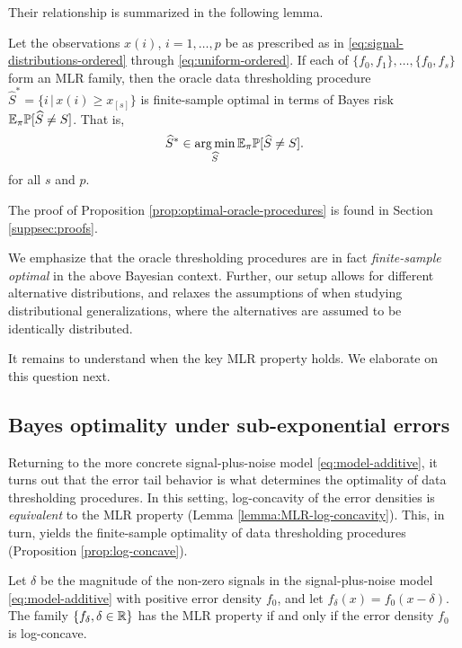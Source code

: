 Their relationship is summarized in the following lemma.

\begin{proposition} \label{prop:optimal-oracle-procedures}
Let the observations $x(i)$, $i=1,\ldots,p$ be as prescribed as in \eqref{eq:signal-distributions-ordered} through \eqref{eq:uniform-ordered}.
If each of $\{f_0, f_{1}\},\ldots,\{f_0,f_{s}\}$ form an MLR family, then the oracle data thresholding procedure $\widehat{S}^* = \{i\,|\, x(i)\ge x_{[s]}\}$ is finite-sample optimal in terms of Bayes risk ${\mathbb E}_\pi {\mathbb P}[\widehat{S} \neq S]$. That is,
\begin{equation} \label{eq:finite-sample-Bayes-optimal}
    \widehat{S}^* \in \operatorname*{arg\,min}_{\widehat{S}} {\mathbb E}_\pi {\mathbb P}[\widehat{S} \neq S].
\end{equation}
for all $s$ and $p$.
\end{proposition} 

The proof of Proposition \ref{prop:optimal-oracle-procedures} is found in Section \ref{suppsec:proofs}.

We emphasize that the oracle thresholding procedures are in fact \emph{finite-sample optimal} in the above Bayesian context.
Further, our setup allows for different alternative distributions, and relaxes the assumptions of \citet{butucea2018variable} when studying distributional generalizations, where the alternatives are assumed to be identically distributed.

It remains to understand when the key MLR property holds. 
We elaborate on this question next.

\subsection{Bayes optimality under sub-exponential errors}
\label{subsec:optimal-procedure-sub-exponential}

Returning to the more concrete signal-plus-noise model \eqref{eq:model-additive}, it turns out that the error tail behavior is what determines the optimality of data thresholding procedures.
In this setting, log-concavity of the error densities is \emph{equivalent} to the MLR property (Lemma \ref{lemma:MLR-log-concavity}). This, in turn, yields the finite-sample optimality of data thresholding procedures (Proposition \ref{prop:log-concave}).

\begin{lemma} \label{lemma:MLR-log-concavity}
Let $\delta$ be the magnitude of the non-zero signals in the signal-plus-noise model \eqref{eq:model-additive} with positive error density $f_0$, and let $f_\delta(x) = f_0(x-\delta)$.
The family $\{f_\delta, \delta \in \mathbb R\}$ has the MLR property if and only if the error density $f_0$ is log-concave.
\end{lemma}

